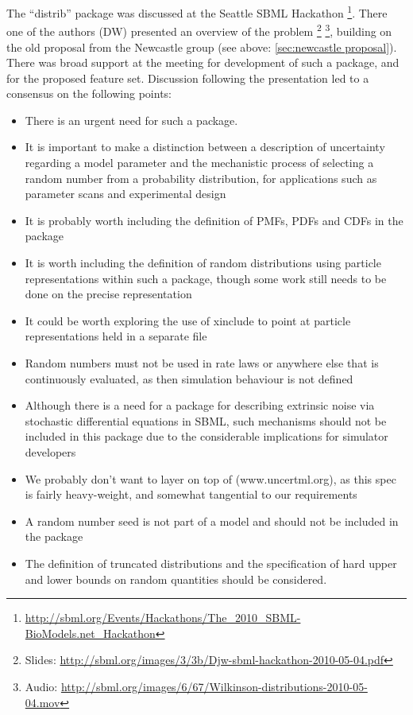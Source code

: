 \documentclass[draftspec]{sbmlpkgspec}
\begin{document}
The ``distrib'' package was discussed at the Seattle SBML Hackathon%
\footnote{\url{http://sbml.org/Events/Hackathons/The_2010_SBML-BioModels.net_Hackathon}}. There
one of the authors (DW) presented an overview of the problem%
\footnote{Slides:
 \url{http://sbml.org/images/3/3b/Djw-sbml-hackathon-2010-05-04.pdf}}%
\footnote{Audio:
  \url{http://sbml.org/images/6/67/Wilkinson-distributions-2010-05-04.mov}},
building on the old proposal from the Newcastle group
 (see above: \ref{sec:newcastle proposal}).
There was broad support at the meeting for development of such a
package, and for the proposed feature set. Discussion following the
presentation led to a consensus on the following points:

\begin{itemize}
\item There is an urgent need for such a package.
\item It is important to make a distinction between a description of
  uncertainty regarding a model parameter and the mechanistic process
  of selecting a random number from a probability distribution, for
  applications such as parameter scans and experimental design
\item It is probably worth including the definition of PMFs, PDFs and CDFs in the package
\item It is worth including the definition of random distributions using particle representations within such a package, though some work
 still needs to be done on the precise representation
\item It could be worth exploring the use of xinclude to point at particle
representations held in a separate file
\item Random numbers must not be used in rate laws or anywhere else that
 is continuously evaluated, as then simulation behaviour is not
 defined
\item Although there is a need for a package for describing extrinsic
 noise via stochastic differential equations in SBML, such mechanisms
 should not be included in this package due to the considerable
 implications for simulator developers
\item We probably don't want to layer on top of \uncertml
 (www.uncertml.org), as this spec is fairly heavy-weight, and
 somewhat tangential to our requirements
\item A random number seed is not part of a model and should not be
 included in the package
\item The definition of truncated distributions and the specification of
 hard upper and lower bounds on random quantities should be
 considered.
\end{itemize}
\end{document}
